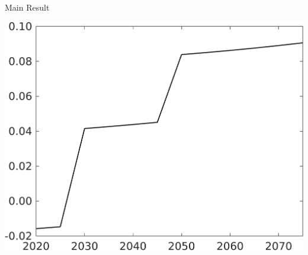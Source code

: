 \documentclass[11pt,aspectratio=169]{beamer}
\begin{document}
\begin{frame}{Main Result}
	\vspace{4mm}
			\centering
	\begin{minipage}[]{0.32\textwidth}
\includegraphics[width=1\textwidth]{../codding_model/own_basedOnFried/optimalPol_elastS_DisuSci/figures/all_1705/Single_OPT_T_NoTaus_taul_spillover0_sep1_BN0_ineq0_red0_etaa0.79.png}
	\end{minipage}
\begin{minipage}[]{0.05\textwidth}
	\ \ \\ 
	\ \ 
\end{minipage}
	\begin{minipage}[]{0.32\textwidth}

\end{minipage}
\end{frame}
\end{document}
